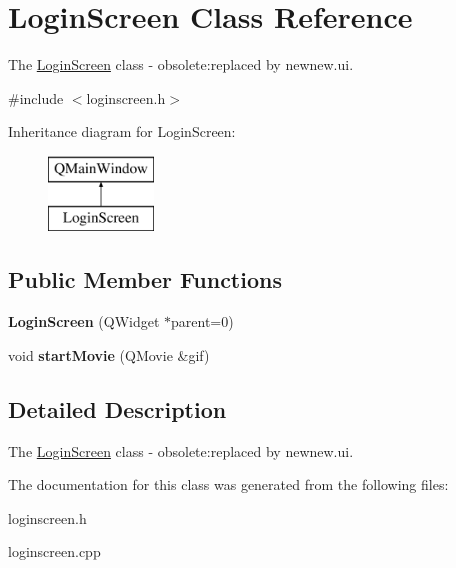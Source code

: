 \hypertarget{class_login_screen}{}\section{Login\+Screen Class Reference}
\label{class_login_screen}


The \hyperlink{class_login_screen}{Login\+Screen} class -\/ obsolete\+:replaced by newnew.\+ui.  




{\ttfamily \#include $<$loginscreen.\+h$>$}

Inheritance diagram for Login\+Screen\+:\begin{figure}[H]
\begin{center}
\leavevmode
\includegraphics[height=2.000000cm]{class_login_screen}
\end{center}
\end{figure}
\subsection*{Public Member Functions}
\begin{DoxyCompactItemize}
\item 
\mbox{\label{class_login_screen_a1ccb3b22efd03d7e49ac9092a638a13c}} 
{\bfseries Login\+Screen} (Q\+Widget $\ast$parent=0)
\item 
\mbox{\label{class_login_screen_af0dc95e76363d78be08d0c5e24d83dbb}} 
void {\bfseries start\+Movie} (Q\+Movie \&gif)
\end{DoxyCompactItemize}


\subsection{Detailed Description}
The \hyperlink{class_login_screen}{Login\+Screen} class -\/ obsolete\+:replaced by newnew.\+ui. 

The documentation for this class was generated from the following files\+:\begin{DoxyCompactItemize}
\item 
loginscreen.\+h\item 
loginscreen.\+cpp\end{DoxyCompactItemize}
